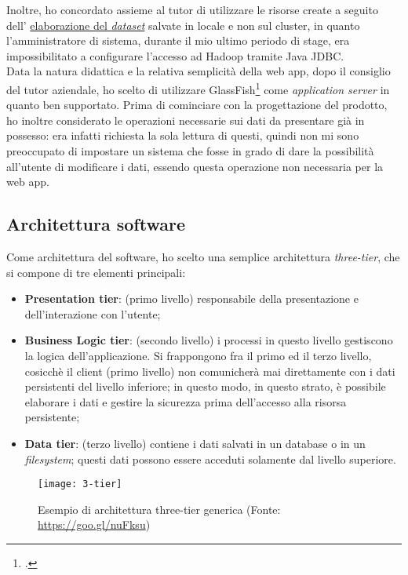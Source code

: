 Inoltre, ho concordato assieme al tutor di utilizzare le risorse create a seguito dell' \hyperref[dataseta]{elaborazione del \textit{dataset}} salvate in locale e non sul \gls{cluster}, in quanto l'amministratore di sistema, durante il mio ultimo periodo di stage, era impossibilitato a configurare l'accesso ad Hadoop tramite \gls{Java JDBC}. \\
Data la natura didattica e la relativa semplicità della \gls{web app}, dopo il consiglio del tutor aziendale, ho scelto di utilizzare GlassFish\footcite{https://javaee.github.io/glassfish/} come \textit{application server} in quanto ben supportato.
Prima di cominciare con la progettazione del prodotto, ho inoltre considerato le operazioni necessarie sui dati da presentare già in possesso: era infatti richiesta la sola lettura di questi, quindi non mi sono preoccupato di impostare un sistema che fosse in grado di dare la possibilità all'utente di modificare i dati, essendo questa operazione non necessaria per la \gls{web app}.

\subsection{Architettura software}
Come architettura del software, ho scelto una semplice architettura \textit{three-tier}, che si compone di tre elementi principali:
\begin{itemize}
	\item \textbf{Presentation tier}: (primo livello) responsabile della presentazione e dell'interazione con l'utente; 
	\item \textbf{Business Logic tier}: (secondo livello) i processi in questo livello gestiscono la logica dell'applicazione. Si frappongono fra il primo ed il terzo livello, cosicchè il client (primo livello) non comunicherà mai direttamente con i dati persistenti del livello inferiore; in questo modo, in questo strato, è possibile elaborare i dati e gestire la sicurezza prima dell'accesso alla risorsa persistente;
	\item \textbf{Data tier}: (terzo livello) contiene i dati salvati in un database o in un \textit{filesystem}; questi dati possono essere acceduti solamente dal livello superiore.
\end{itemize}

\begin{figure}[!h]
	\centering
	\texttt{[image: 3-tier]}
	\caption{Esempio di architettura three-tier generica (Fonte: \href{https://goo.gl/nuFksu}{https://goo.gl/nuFksu})}
\end{figure}

